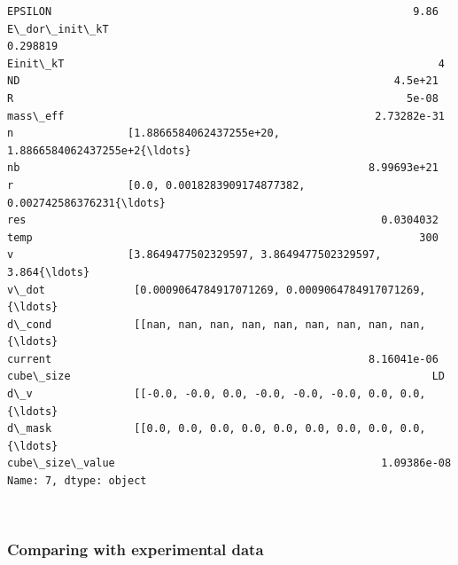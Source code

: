 \documentclass[11pt]{article}
\makeatletter
\newcommand{\boxspacing}{\kern\kvtcb@left@rule\kern\kvtcb@boxsep}
\newcommand{\prompt}[4]{
        \ttfamily\llap{{\color{#2}[#3]:\hspace{3pt}#4}}\vspace{-\baselineskip}
    }
\makeatother
\begin{document}
            \begin{tcolorbox}[breakable, size=fbox, boxrule=.5pt, pad at break*=1mm, opacityfill=0]
\prompt{Out}{outcolor}{145}{\boxspacing}
\begin{Verbatim}[commandchars=\\\{\}]
EPSILON                                                         9.86
E\_dor\_init\_kT                                               0.298819
Einit\_kT                                                           4
ND                                                           4.5e+21
R                                                              5e-08
mass\_eff                                                 2.73282e-31
n                  [1.8866584062437255e+20, 1.8866584062437255e+2{\ldots}
nb                                                       8.99693e+21
r                  [0.0, 0.0018283909174877382, 0.002742586376231{\ldots}
res                                                        0.0304032
temp                                                             300
v                  [3.8649477502329597, 3.8649477502329597, 3.864{\ldots}
v\_dot              [0.0009064784917071269, 0.0009064784917071269,{\ldots}
d\_cond             [[nan, nan, nan, nan, nan, nan, nan, nan, nan,{\ldots}
current                                                  8.16041e-06
cube\_size                                                         LD
d\_v                [[-0.0, -0.0, 0.0, -0.0, -0.0, -0.0, 0.0, 0.0,{\ldots}
d\_mask             [[0.0, 0.0, 0.0, 0.0, 0.0, 0.0, 0.0, 0.0, 0.0,{\ldots}
cube\_size\_value                                          1.09386e-08
Name: 7, dtype: object
\end{Verbatim}
\end{tcolorbox}
        
    \begin{center}
    \end{center}
    { \hspace*{\fill} \\}
    
    \hypertarget{comparing-with-experimental-data}{%
\subsubsection{Comparing with experimental
data}\label{comparing-with-experimental-data}}
\end{document}
